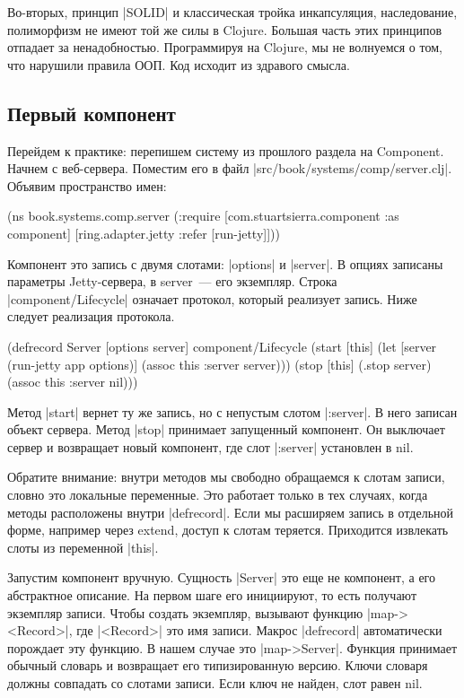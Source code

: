 Во-вторых, принцип \spverb|SOLID| и классическая тройка инкапсуляция, наследование,
полиморфизм не имеют той же силы в Clojure. Большая часть этих принципов
отпадает за ненадобностью. Программируя на Clojure, мы не волнуемся о том, что
нарушили правила ООП. Код исходит из здравого смысла.

\subsection{Первый компонент}

Перейдем к практике: перепишем систему из прошлого раздела на Component. Начнем
с веб-сервера. Поместим его в файл \spverb|src/book/systems/comp/server.clj|. Объявим
пространство имен:

\begin{code}
(ns book.systems.comp.server
  (:require
   [com.stuartsierra.component :as component]
   [ring.adapter.jetty :refer [run-jetty]]))
\end{code}

Компонент это запись с двумя слотами: \spverb|options| и \spverb|server|. В опциях записаны
параметры Jetty-сервера, в server~--- его экземпляр. Строка \spverb|component/Lifecycle|
означает протокол, который реализует запись. Ниже следует реализация протокола.

\begin{code}
(defrecord Server
    [options server]
  component/Lifecycle
  (start [this]
    (let [server (run-jetty app options)]
      (assoc this :server server)))
  (stop [this]
    (.stop server)
    (assoc this :server nil)))
\end{code}

Метод \spverb|start| вернет ту же запись, но с непустым слотом \spverb|:server|. В него
записан объект сервера. Метод \spverb|stop| принимает запущенный компонент. Он
выключает сервер и возвращает новый компонент, где слот \spverb|:server| установлен в
nil.

Обратите внимание: внутри методов мы свободно обращаемся к слотам записи, словно
это локальные переменные. Это работает только в тех случаях, когда методы
расположены внутри \spverb|defrecord|. Если мы расширяем запись в отдельной форме,
например через extend, доступ к слотам теряется. Приходится извлекать слоты из
переменной \spverb|this|.

Запустим компонент вручную. Сущность \spverb|Server| это еще не компонент, а его
абстрактное описание. На первом шаге его инициируют, то есть получают экземпляр
записи. Чтобы создать экземпляр, вызывают функцию \spverb|map-><Record>|, где
\spverb|<Record>| это имя записи. Макрос \spverb|defrecord| автоматически порождает эту
функцию. В нашем случае это \spverb|map->Server|. Функция принимает обычный словарь и
возвращает его типизированную версию. Ключи словаря должны совпадать со слотами
записи. Если ключ не найден, слот равен nil.


